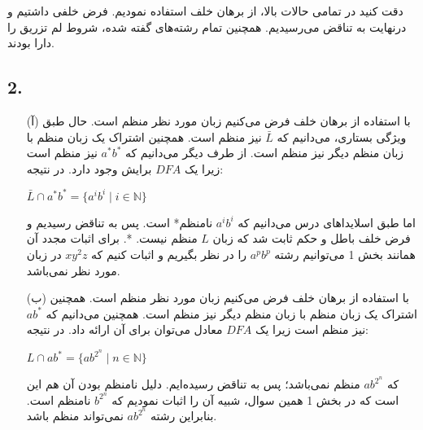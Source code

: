 دقت کنید در تمامی حالات بالا، از برهان خلف استفاده نمودیم. فرض خلفی داشتیم و درنهایت به تناقض می‌رسیدیم. همچنین تمام رشته‌های گفته شده، شروط لم تزریق را دارا بودند.\\

\subsection*{2. }
\begin{itemize}
    \item[(آ)]
    با استفاده از برهان خلف فرض می‌کنیم زبان مورد نظر منظم است.
    حال طبق ویژگی بستاری، می‌دانیم که 
    $\bar{L}$ نیز منظم است. همچنین اشتراک یک زبان منظم با زبان منظم دیگر نیز منظم است.
    از طرف دیگر می‌دانیم که $a^*b^*$ نیز منظم است زیرا یک $DFA$ برایش وجود دارد.
    در نتیجه:
    \begin{center}
        $\bar{L} \cap a^*b^* = \{a^ib^i\;|\;i \in \mathbb{N}\}$\\[0.1in]
    \end{center}
    اما طبق اسلایداهای درس می‌دانیم که $a^ib^i$ نامنظم* است.
    پس به تناقض رسیدیم و فرض خلف باطل و حکم ثابت شد که زبان
    $L$ منظم نیست.\newline\newline
    *. برای اثبات مجدد آن همانند بخش 1 می‌توانیم رشته 
    $a^pb^p$ را در نظر بگیریم و اثبات کنیم که $xy^2z$ در زبان مورد نظر نمی‌باشد.
    \newline
    \item[(ب)]
    با استفاده از برهان خلف فرض می‌کنیم زبان مورد نظر منظم است.
    همچنین اشتراک یک زبان منظم با زبان منظم دیگر نیز منظم است.
    همچنین می‌دانیم که $ab^*$ نیز منظم است زیرا یک $DFA$ معادل می‌توان برای آن ارائه داد.
    در نتیجه:
    \begin{center}
        $L \cap ab^* = \{ab^{2^n}\;|\;n \in \mathbb{N}\}$\\[0.1in]
    \end{center}
    که $ab^{2^n}$ منظم نمی‌باشد؛ پس به تناقض رسیده‌ایم. دلیل نامنظم بودن آن هم این است که در بخش 1 همین سوال، شبیه آن را اثبات نمودیم که $b^{2^n}$ نامنظم است. بنابراین رشته $ab^{2^n}$ نمی‌تواند منظم باشد.
\end{itemize}